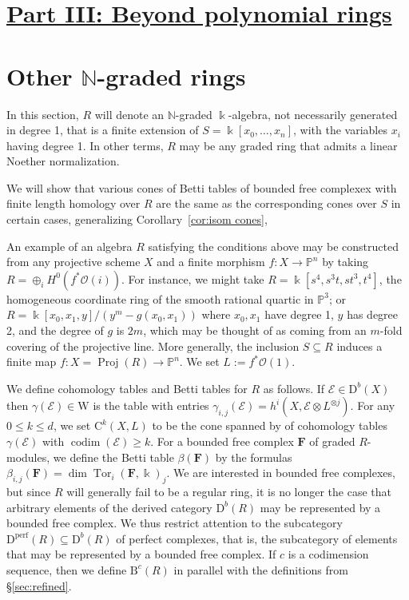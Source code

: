 \documentclass[12pt]{amsart}
\theoremstyle{definition}
\theoremstyle{remark}
\newcommand{\Proj}{\operatorname{Proj}}
\newcommand{\Tor}{\operatorname{Tor}}
\newcommand{\kk}{\Bbbk}
\newcommand{\codim}{\operatorname{codim}}
\newcommand{\PP}{\mathbb{P}}
\newcommand{\WW}{\mathrm{W}}
\newcommand{\NN}{\mathbb{N}}
\newcommand{\cc}{c}
\newcommand{\cO}{\mathcal{O}}
\newcommand{\cE}{\mathcal{E}}
\newcommand{\FF}{\mathbf{F}}
\newcommand{\DD}{\mathrm{D}}
\newcommand{\CQ}{\mathrm{C}}
\newcommand{\BBQ}{\mathrm{B}}
\renewcommand{\P}{{\mathbb P}}
\begin{document}
\section*{\underline{{Part III: Beyond polynomial rings}}}
\section{Other $\NN$-graded rings}\label{sec:functor}
 In this section, $R$ will denote an $\NN$-graded $\kk$-algebra, not necessarily generated in degree 1, that is a finite extension of $S=\kk[x_0,\dots,x_n]$, with the variables $x_{i}$ having degree 1.  In other terms, $R$ may be any graded ring that admits a linear Noether normalization. 
 
 We will 
 show that various cones of Betti tables of
 bounded free complexex with finite length homology over $R$ are the same as the
 corresponding cones over $S$ in certain cases, generalizing Corollary~\ref{cor:isom cones}, 
 
An example of an algebra $R$ satisfying the conditions above may be constructed from any projective scheme $X$ and a finite morphism $f:X\to \PP^{n}$ by taking $R = \oplus_{i}H^{0}(f^{*}\cO(i))$. For instance, we might take
$R = \kk[s^{4}, s^{3}t, st^{3}, t^{4}]$, the homogeneous coordinate ring of the smooth rational
quartic in $\P^{3}$; or $R = \kk[x_{0}, x_{1}, y]/(y^{m}-g(x_{0}, x_{1}))$ where $x_{0},x_{1}$ have
degree 1, $y$ has degree 2, and the degree of $g$ is $2m$, which may be thought of as 
coming from an $m$-fold covering of the projective line.
 More generally, the inclusion $S\subseteq R$ induces a finite map $f\colon X=\Proj(R)\to \PP^n$. We set $L:=f^*\cO(1)$. 

We define cohomology tables and Betti tables for $R$ as follows. If $\cE\in \DD^b(X)$ then $\gamma(\cE)\in \WW$ is the table with entries $\gamma_{i,j}(\cE)=h^i(X,\cE\otimes L^{\otimes j})$.  For any $0\leq k \leq d$, we set $\CQ^{k}(X,L)$ to be the cone spanned by of cohomology tables $\gamma(\cE)$ with $\codim(\cE)\geq k$.  For a bounded free complex $\FF$ of graded $R$-modules, we define the Betti table $\beta(\FF)$ by the formulas $\beta_{i,j}(\FF)=\dim \Tor_i(\FF,\kk)_j$.  
We are interested in bounded free complexes, but since $R$ will generally fail to be a regular ring, it is no longer the case that arbitrary elements of the derived category 
$\DD^b(R)$ may be represented by a bounded free complex.  
We thus restrict attention to the subcategory $\DD^{\text{perf}}(R)\subseteq \DD^b(R)$ of perfect complexes, that is, the subcategory of elements that may be
represented by a  bounded free complex.
If $\cc$ is a codimension sequence, then we define $\BBQ^{\cc}(R)$ in parallel with the definitions from \S\ref{sec:refined}.  
\end{document}
